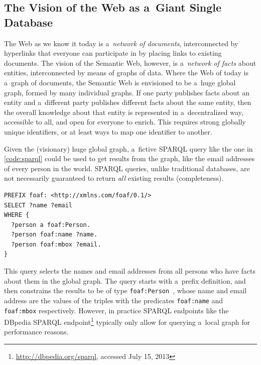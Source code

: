 \subsection{The Vision of the Web as a~Giant Single Database}

The Web as we know it today is a~\emph{network of documents},
interconnected by hyperlinks that everyone can participate in
by placing links to existing documents.
The vision of the Semantic Web, however,
is a~\emph{network of facts} about entities,
interconnected by means of graphs of data.
Where the Web of today is a~graph of documents,
the Semantic Web is envisioned to be a~huge global graph,
formed by many individual graphs.
If one party publishes facts about an entity
and a~different party publishes different facts
about the same entity,
then the overall knowledge about that entity
is represented in a~decentralized way,
accessible to all, and open for everyone to enrich.
This requires strong globally unique identifiers,
or at least ways to map one identifier to another.

Given the (visionary) huge global graph, a~fictive
SPARQL query like the one in \autoref{code:sparql}
could be used to get results from the graph,
like the email addresses of every person in the world.
SPARQL queries, unlike traditional databases, are not necessarily
guaranteed to return \emph{all} existing results (completeness).

\begin{lstlisting}[caption={[Fictive SPARQL query returning names and
  email addresses]
  {Fictive SPARQL query returning the names and email addresses of every
  person in the world
  (\url{http://en.wikipedia.org/wiki/SPARQL\#Benefits}, accessed July 15, 2013)}},
  label={code:sparql}]
PREFIX foaf: <http://xmlns.com/foaf/0.1/>
SELECT ?name ?email
WHERE {
  ?person a foaf:Person.
  ?person foaf:name ?name.
  ?person foaf:mbox ?email.
}
\end{lstlisting}

This query selects the names and email addresses from all persons
who have facts about them in the global graph.
The query starts with a~prefix definition,
and then constrains the results
to be of type \texttt{foaf:Person}~\cite{brickley2010foaf},
whose name and email address are the values
of the triples with the predicates \texttt{foaf:name}
and \texttt{foaf:mbox} respectively.
However, in practice SPARQL endpoints
like the DBpedia SPARQL
endpoint\footnote{\url{http://dbpedia.org/sparql}, accessed July 15, 2013}
typically only allow for querying a~local graph
for performance reasons.

